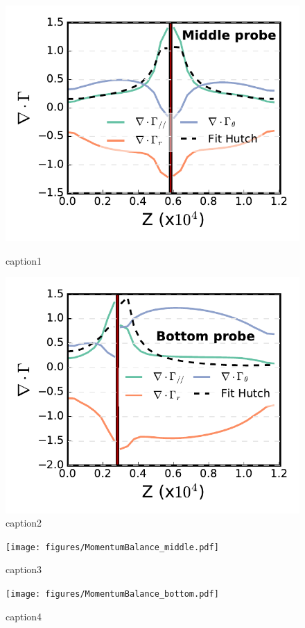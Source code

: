 \documentclass[cpp,a4paper,fleqn,twoside%
]{w-art}
\begin{document}
\begin{figure}
\begin{minipage}{68mm}
\includegraphics[width=\linewidth]{figures/PartBalance_middle.pdf} 
\caption{caption1}
\label{fig:7}
\end{minipage}
\hfill
\begin{minipage}{68mm}\vspace{20pt}
\includegraphics[width=\linewidth]{figures/PartBalance_bottom.pdf}
\caption{caption2}
\label{fig:8}


\end{minipage}
\end{figure}
\begin{figure}
\begin{minipage}{68mm}
\texttt{[image: figures/MomentumBalance\_middle.pdf]} 
\caption{caption3}
\label{fig:9}
\end{minipage}
\hfill
\begin{minipage}{68mm}\vspace{20pt}
\texttt{[image: figures/MomentumBalance\_bottom.pdf]}
\caption{caption4}
\label{fig:10}

\end{minipage}
\end{figure}
\end{document}
